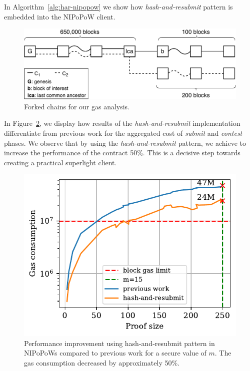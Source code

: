 In Algorithm~\ref{alg:har-nipopow} we show how \emph{hash-and-resubmit} pattern
is embedded into the NIPoPoW client.

\begin{figure}[!h]
    \begin{center}
        \includegraphics[width=1\columnwidth]{figures/nipopow-subm-cont}
    \end{center}
    \caption{Forked chains for our gas analysis.}
    \label{fig:chains}
\end{figure}

In Figure~\ref{fig:har-nipopow}, we display how results of the
\emph{hash-and-resubmit} implementation differentiate from previous work for
the aggregated cost of \emph{submit} and \emph{contest} phases.  We observe
that by using the \emph{hash-and-resubmit} pattern, we achieve to increase the
performance of the contract 50\%. This is a decisive step towards creating a
practical superlight client.



\begin{figure}[!h]
    \begin{center}
        \includegraphics[width=1\columnwidth]{figures/har-nipopows.pdf}
    \end{center}
    \caption{Performance improvement using hash-and-resubmit pattern in
    NIPoPoWs compared to previous work for a secure value of $m$. The gas
    consumption decreased by approximately 50\%.}
    \label{fig:har-nipopow}
\end{figure}

